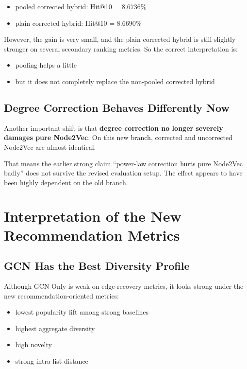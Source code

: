 \documentclass[11pt,a4paper]{article}
\begin{document}
\begin{itemize}
    \item pooled corrected hybrid: Hit@10 = $8.6736\%$
    \item plain corrected hybrid: Hit@10 = $8.6690\%$
\end{itemize}

However, the gain is very small, and the plain corrected hybrid is still
slightly stronger on several secondary ranking metrics. So the correct
interpretation is:

\begin{itemize}
    \item pooling helps a little
    \item but it does not completely replace the non-pooled corrected hybrid
\end{itemize}

\subsection{Degree Correction Behaves Differently Now}
Another important shift is that \textbf{degree correction no longer severely
damages pure Node2Vec}. On this new branch, corrected and uncorrected Node2Vec
are almost identical.

That means the earlier strong claim
``power-law correction hurts pure Node2Vec badly'' does not survive the revised
evaluation setup. The effect appears to have been highly dependent on the old
branch.

\section{Interpretation of the New Recommendation Metrics}

\subsection{GCN Has the Best Diversity Profile}
Although GCN Only is weak on edge-recovery metrics, it looks strong under the
new recommendation-oriented metrics:

\begin{itemize}
    \item lowest popularity lift among strong baselines
    \item highest aggregate diversity
    \item high novelty
    \item strong intra-list distance
\end{itemize}
\end{document}
